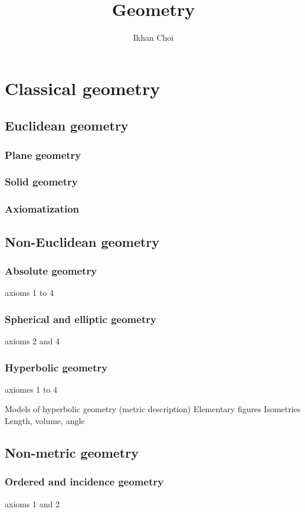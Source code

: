\documentclass{../../large}
\begin{document}
\title{Geometry}
\author{Ikhan Choi}
\maketitle
\tableofcontents

\part{Classical geometry}
\chapter{Euclidean geometry}

\section{Plane geometry}
\section{Solid geometry}
\section{Axiomatization}

\chapter{Non-Euclidean geometry}
\section{Absolute geometry}
axioms 1 to 4
\section{Spherical and elliptic geometry}
axioms 2 and 4
\section{Hyperbolic geometry}
axiomes 1 to 4

Models of hyperbolic geometry (metric description)
Elementary figures
Isometries
Length, volume, angle

\chapter{Non-metric geometry}
\section{Ordered and incidence geometry}
axioms 1 and 2
\end{document}
